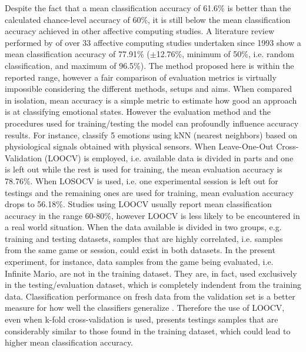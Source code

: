 Despite the fact that a mean classification accuracy of 61.6\% is better than the calculated chance-level accuracy of 60\%, it is still below the mean classification accuracy achieved in other affective computing studies. A literature review performed by \textcite{moghimi2017affective} of over 33 affective computing studies undertaken since 1993 show a mean classification accuracy of 77.91\% ($\pm$12.76\%, minimum of 50\%, i.e. random classification, and maximum of 96.5\%). The method proposed here is within the reported range, however a fair comparison of evaluation metrics is virtually impossible considering the different methods, setups and aims. When compared in isolation, mean accuracy is a simple metric to estimate how good an approach is at classifying emotional states. However the evaluation method and the procedures used for training/testing the model can profoundly influence accuracy results. For instance, \textcite{kukolja2014comparative} classify 5 emotions using kNN (nearest neighbors) based on physiological signals obtained with physical sensors. When Leave-One-Out Cross-Validation (LOOCV) is employed, i.e. available data is divided in parts and one is left out while the rest is used for training, the mean evaluation accuracy is 78.76\%. When LOSOCV is used, i.e. one experimental session is left out for testings and the remaining ones are used for training, mean evaluation accuracy drops to 56.18\%. Studies using LOOCV usually report mean classification accuracy in the range 60-80\%, however LOOCV is less likely to be encountered in a real world situation. When the data available is divided in two groups, e.g. training and testing datasets, samples that are highly correlated, i.e. samples from the same game or session, could exist in both datasets. In the present experiment, for instance, data samples from the game being evaluated, i.e. Infinite Mario, are not in the training dataset. They are, in fact, used exclusively in the testing/evaluation dataset, which is completely indendent from the training data. Classification performance on fresh data from the validation set is a better measure for how well the classifiers generalize \parencite[Chapter 5]{james2013introduction}. Therefore the use of LOOCV, even when k-fold cross-validation is used, presents testings samples that are considerably similar to those found in the training dataset, which could lead to higher mean classification accuracy.

